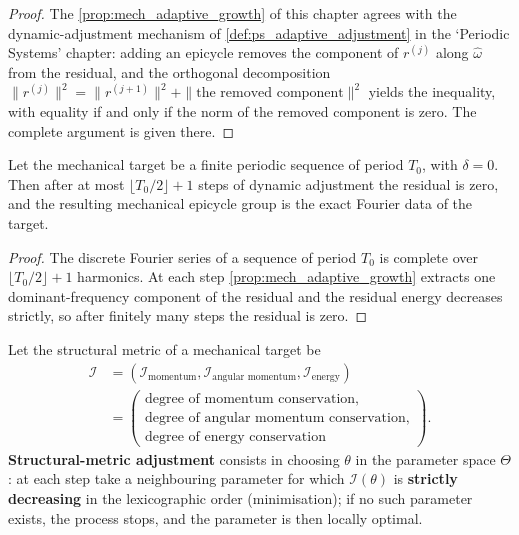 \begin{proof}
The \cref{prop:mech_adaptive_growth} of this chapter agrees with the dynamic-adjustment mechanism of \cref{def:ps_adaptive_adjustment} in the `Periodic Systems' chapter:
adding an epicycle removes the component of $r^{(j)}$ along $\hat\omega$ from the residual, and the orthogonal decomposition
$\|r^{(j)}\|^2=\|r^{(j+1)}\|^2+\|\text{the removed component}\|^2$ yields the inequality,
with equality if and only if the norm of the removed component is zero. The complete argument is given there.
\end{proof}

\begin{theorem}\label{thm:mech_adaptive_convergence}
Let the mechanical target be a finite periodic sequence of period $T_0$, with $\delta=0$. Then after at most $\lfloor T_0/2\rfloor+1$ steps of dynamic adjustment the residual is zero, and the resulting mechanical epicycle group is the exact Fourier data of the target.
\end{theorem}

\begin{proof}
The discrete Fourier series of a sequence of period $T_0$ is complete over $\lfloor T_0/2\rfloor+1$ harmonics. At each step \cref{prop:mech_adaptive_growth} extracts one dominant-frequency component of the residual and the residual energy decreases strictly, so after finitely many steps the residual is zero.
\end{proof}

\begin{definition}\label{def:mech_structure_metric_adjustment}
Let the structural metric of a mechanical target be
\[
\begin{aligned}
\mathcal I
&=(\mathcal I_{\text{momentum}},\mathcal I_{\text{angular momentum}},\mathcal I_{\text{energy}})\\
&=\left(\begin{array}{l}
\text{degree of momentum conservation},\\
\text{degree of angular momentum conservation},\\
\text{degree of energy conservation}
\end{array}\right).
\end{aligned}
\]
\textbf{Structural-metric adjustment} consists in choosing $\theta$ in the parameter space $\Theta$: at each step take a neighbouring parameter for which $\mathcal I(\theta)$ is \textbf{strictly decreasing} in the lexicographic order (minimisation); if no such parameter exists, the process stops, and the parameter is then locally optimal.
\end{definition}

